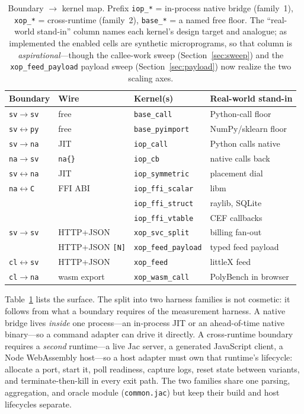 \documentclass[conference]{IEEEtran}
\newcommand{\code}[1]{\texttt{#1}}
\begin{document}
\begin{table}[t]
\caption{Boundary $\rightarrow$ kernel map. Prefix \code{iop\_*} = in-process
native bridge (family~1), \code{xop\_*} = cross-runtime (family~2),
\code{base\_*} = a named free floor. The ``real-world stand-in'' column names
each kernel's design target and analogue; as implemented the enabled cells are
synthetic microprograms, so that column is \emph{aspirational}---though the
callee-work sweep (Section~\ref{sec:sweep}) and the \code{xop\_feed\_payload}
payload sweep (Section~\ref{sec:payload}) now realize the two scaling axes.}
\label{tab:map}
\centering
\small
\begin{tabular}{@{}llll@{}}
\toprule
Boundary & Wire & Kernel(s) & Real-world stand-in \\
\midrule
\code{sv}$\rightarrow$\code{sv} & free & \code{base\_call} & Python-call floor \\
\code{sv}$\leftrightarrow$\code{py} & free & \code{base\_pyimport} & NumPy/sklearn floor \\
\code{sv}$\rightarrow$\code{na} & JIT & \code{iop\_call} & Python calls native \\
\code{na}$\rightarrow$\code{sv} & \code{na\{\}} & \code{iop\_cb} & native calls back \\
\code{sv}$\leftrightarrow$\code{na} & JIT & \code{iop\_symmetric} & placement dial \\
\code{na}$\leftrightarrow$\code{C} & FFI ABI & \code{iop\_ffi\_scalar} & libm \\
& & \code{iop\_ffi\_struct} & raylib, SQLite \\
& & \code{iop\_ffi\_vtable} & CEF callbacks \\
\code{sv}$\rightarrow$\code{sv} & HTTP+JSON & \code{xop\_svc\_split} & billing fan-out \\
& HTTP+JSON \code{[N]} & \code{xop\_feed\_payload} & typed feed payload \\
\code{cl}$\leftrightarrow$\code{sv} & HTTP+JSON & \code{xop\_feed} & littleX feed \\
\code{cl}$\rightarrow$\code{na} & wasm export & \code{xop\_wasm\_call} & PolyBench in browser \\
\bottomrule
\end{tabular}
\end{table}

Table~\ref{tab:map} lists the surface. The split into two harness families is not
cosmetic: it follows from what a boundary requires of the measurement harness. A
native bridge lives \emph{inside} one process---an in-process JIT or an
ahead-of-time native binary---so a command adapter can drive it directly. A
cross-runtime boundary requires a \emph{second} runtime---a live Jac server, a
generated JavaScript client, a Node WebAssembly host---so a host adapter must own
that runtime's lifecycle: allocate a port, start it, poll readiness, capture
logs, reset state between variants, and terminate-then-kill in every exit path.
The two families share one parsing, aggregation, and oracle module
(\code{common.jac}) but keep their build and host lifecycles separate.
\end{document}
